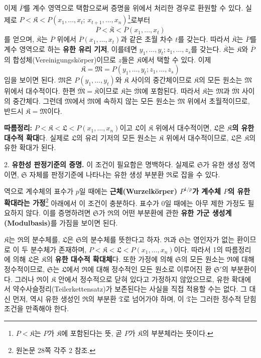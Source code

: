 이제 $\overline P$를 계수 영역으로 택함으로써 증명을 위에서 처리한 경우로 환원할 수 있다. 실제로 $P<\mathfrak K<P(x_1,\ldots,x_t;\,x_{t+1},\ldots,x_n)$\footnote{$P<\mathfrak K$는 $P$가 $\mathfrak K$에 포함된다는 뜻, 곧 $P$가 $\mathfrak K$의 부분체라는 뜻이다.}로부터
\[
\overline P<\overline{\mathfrak K}<\overline P(x_1,\ldots,x_t)
\]
를 얻으며, $\overline{\mathfrak K}$는 $\overline P$ 위에서 $\overline P(x_1,\ldots,x_t)$과 같은 초월 차수 $t$를 갖는다. 따라서 $\overline{\mathfrak K}$는 $\overline P$를 계수 영역으로 하는 \textbf{유한 유리 기저}, 이를테면 $y_1,\ldots,y_t;z_1,\ldots,z_s$를 갖는다. $\overline{\mathfrak K}$는 $\mathfrak K$와 $\overline P$의 합성체(Vereinigungskörper)이므로 $z$들은 $\mathfrak K$에서 택할 수 있다. 이제
\[
\mathfrak K=\mathfrak M=P(y_1,\ldots,y_t;z_1,\ldots,z_s)
\]
임을 보이면 된다. $\mathfrak M$은 $P(y_1,\ldots,y_t)$와 $\mathfrak K$ 사이의 중간체이므로 $\mathfrak K$의 모든 원소는 $\mathfrak M$ 위에서 대수적이다. 한편 $\overline{\mathfrak M}=\overline{\mathfrak K}$이므로 $\mathfrak K$는 $\overline{\mathfrak M}$에 포함된다. 따라서 $\mathfrak K$는 $\mathfrak M$과 $\overline{\mathfrak M}$ 사이의 중간체다. 그런데 $\overline{\mathfrak M}$에서 $\mathfrak M$에 속하지 않는 모든 원소는 $\mathfrak M$ 위에서 초월적이므로, 반드시 $\mathfrak K=\mathfrak M$이다.

\textbf{따름정리:} $P<\mathfrak K<\mathfrak L<P(x_1,\ldots,x_n)$이고 $\mathfrak L$이 $\mathfrak K$ 위에서 대수적이면, $\mathfrak L$은 \textbf{$\mathfrak K$의 유한 대수적 확대}다. 실제로 $\mathfrak L$의 유리 기저의 모든 원소는 $\mathfrak K$ 위에서 대수적이므로, $\mathfrak L$은 $\mathfrak K$의 유한 확대가 된다.

2. \textbf{유한성 판정기준의 증명.} 이 조건이 필요함은 명백하다. 실제로 $\mathfrak S$가 유한 생성 정역이면, $\mathfrak S$ 자체를 판정기준에 나타나는 유한 생성 부분환 $\mathfrak R$로 잡을 수 있다.

역으로 계수체의 표수가 $p$일 때에는 \textbf{근체(Wurzelkörper) $P^{1/p}$가 계수체 $P$의 유한 확대라는 가정}\footnote{원논문 28쪽 각주 2 참조.} 아래에서 이 조건이 충분하다. 표수가 0일 때에는 아무 제한 가정도 필요하지 않다. 이를 증명하려면 $\mathfrak S$가 $\mathfrak R$의 어떤 부분환에 관한 \textbf{유한 가군 생성계(Modulbasis)}를 가짐을 보이면 된다.

$\mathfrak K$는 $\mathfrak R$의 분수체\footnotemark[\value{footnote}]를, $\mathfrak L$은 $\mathfrak S$의 분수체를 뜻한다고 하자. $\mathfrak R$과 $\mathfrak S$는 영인자가 없는 환이므로 이 두 분수체가 존재하며, $P<\mathfrak K<\mathfrak L<P(x_1,\ldots,x_n)$이다. 따라서 1의 따름정리에 의해 $\mathfrak L$은 $\mathfrak K$의 \textbf{유한 대수적 확대체}다. 또한 가정에 의해 $\mathfrak S$의 모든 원소는 $\mathfrak R$에 대해 정수적이므로, $\mathfrak S$는 $\mathfrak L$에서 $\mathfrak R$에 대해 정수적인 모든 원소로 이루어진 환 $\mathfrak S'$의 부분환이다. 그러나 $\mathfrak R$이 $\mathfrak K$ 안에서 정수적으로 닫혀 있다고 가정하지 않았으므로, 유한 확대에서 약수사슬정리(Teilerkettensatz)가 보존된다는 사실을 직접 적용할 수는 없다. 그 대신 먼저, 역시 유한 생성인 $\mathfrak R$의 부분환 $\mathfrak T$로 넘어가야 하며, 이 $\mathfrak T$는 그러한 정수적 닫힘 조건을 만족해야 한다.

